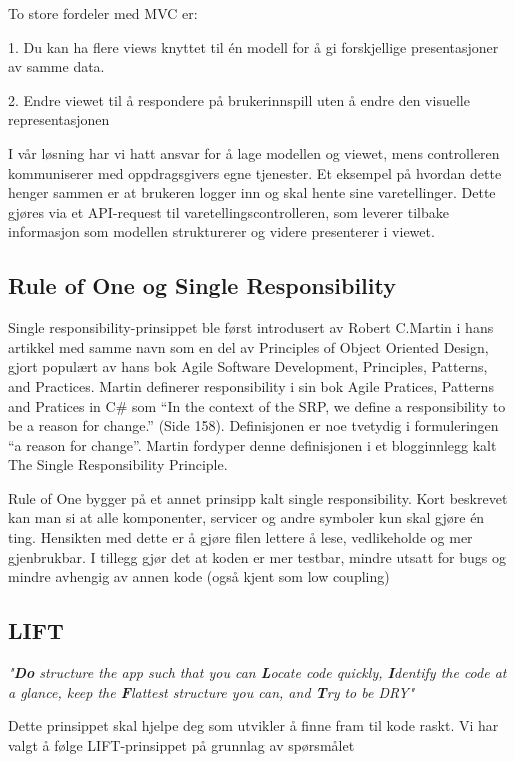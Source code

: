 To store fordeler med MVC er:

1. Du kan ha flere views knyttet til én modell for å gi forskjellige presentasjoner av samme data.

2. Endre viewet til å respondere på brukerinnspill uten å endre den visuelle representasjonen

 I vår løsning har vi hatt ansvar for å lage modellen og viewet, mens controlleren kommuniserer med oppdragsgivers egne tjenester. Et eksempel på hvordan dette henger sammen er at brukeren logger inn og skal hente sine varetellinger. Dette gjøres via et API-request til varetellingscontrolleren, som leverer tilbake informasjon som modellen strukturerer og videre presenterer i viewet. 

\subsection{\textbf{Rule of One og Single Responsibility}}
Single responsibility-prinsippet ble først introdusert av Robert C.Martin i hans artikkel med samme navn som en del av Principles of Object Oriented Design, gjort populært av hans bok Agile Software Development, Principles, Patterns, and Practices. Martin definerer responsibility i sin bok Agile Pratices, Patterns and Pratices in C\# som “In the context of the SRP, we define a responsibility to be a reason for change.” (Side 158). Definisjonen er noe tvetydig i formuleringen “a reason for change”. Martin fordyper denne definisjonen i et blogginnlegg kalt The Single Responsibility Principle.  

Rule of One bygger på et annet prinsipp kalt single responsibility. Kort beskrevet kan man si at alle komponenter, servicer og andre symboler kun skal gjøre én ting. Hensikten med dette er å gjøre filen lettere å lese, vedlikeholde og mer gjenbrukbar. I tillegg gjør det at koden er mer testbar, mindre utsatt for bugs og mindre avhengig av annen kode (også kjent som low coupling)

\subsection{\textbf{LIFT}}

\textit{"\textbf{Do} structure the app such that you can \textbf{L}ocate code quickly, \textbf{I}dentify the code at a glance, keep the \textbf{F}lattest structure you can, and \textbf{T}ry to be DRY"} 

Dette prinsippet skal hjelpe deg som utvikler å finne fram til kode raskt. Vi har valgt å følge LIFT-prinsippet på grunnlag av spørsmålet


